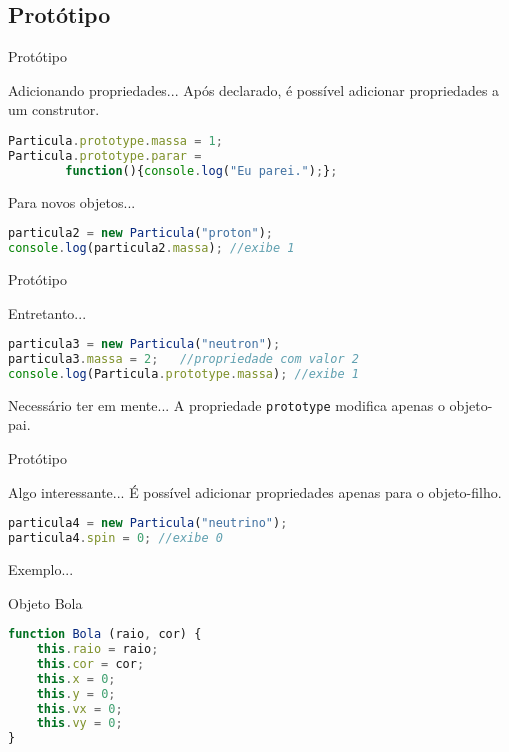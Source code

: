 \documentclass[xcolor=dvipsnames,table]{beamer}
\begin{document}
\subsection{Protótipo}
\begin{frame}[fragile]{Protótipo}
	\begin{block}{Adicionando propriedades...}
		Após declarado, é possível adicionar propriedades a um construtor.
		\begin{lstlisting}[language=JavaScript]
Particula.prototype.massa = 1;
Particula.prototype.parar = 
		function(){console.log("Eu parei.");};
\end{lstlisting}	
	\end{block} \pause
	\begin{block}{Para novos objetos...}
		\begin{lstlisting}[language=JavaScript]
particula2 = new Particula("proton");
console.log(particula2.massa); //exibe 1
\end{lstlisting}	
	\end{block}
\end{frame}

\begin{frame}[fragile]{Protótipo}
	\begin{block}{Entretanto...}
		\begin{lstlisting}[language=JavaScript]
particula3 = new Particula("neutron");
particula3.massa = 2;	//propriedade com valor 2
console.log(Particula.prototype.massa);	//exibe 1
\end{lstlisting}	
	\end{block} 
	\begin{alertblock}{Necessário ter em mente...}
		A propriedade {\tt prototype} modifica apenas o objeto-pai.	
	\end{alertblock}
\end{frame}

\begin{frame}[fragile]{Protótipo}
	\begin{block}{Algo interessante...}
		É possível adicionar propriedades apenas para o objeto-filho.
		\begin{lstlisting}[language=JavaScript]
particula4 = new Particula("neutrino");
particula4.spin = 0; //exibe 0
\end{lstlisting}	
	\end{block}
\end{frame}

\begin{frame}[fragile]{Exemplo...}
	\begin{block}{Objeto Bola}
		\begin{lstlisting}[language=JavaScript]
function Bola (raio, cor) {
	this.raio = raio;
	this.cor = cor;
	this.x = 0;
	this.y = 0;
	this.vx = 0;
	this.vy = 0;
}
\end{lstlisting}	
	\end{block}
\end{frame}
\end{document}
